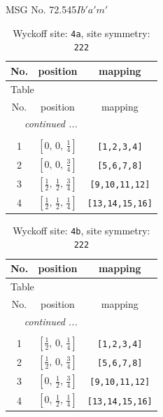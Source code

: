 \documentclass[fleqn,8pt]{jsarticle}
\begin{document}
\setcounter{MaxMatrixCols}{32}

\renewcommand{\tablename}{Table~}
\renewcommand{\figurename}{Figure~}
\begin{center}
\LARGE
MSG No. 72.545\quad$Ib'a'm'$
\end{center}
\renewcommand{\arraystretch}{1.2}
\begin{longtable}{ccc}
\caption{Wyckoff site: {\tt 4a}, site symmetry: {\tt 222}}
 \\
 \hline \hline
No. & position & mapping \\ \hline \endfirsthead

\multicolumn{2}{l}{\tablename\ \thetable{}} \\
 \hline \hline
No. & position & mapping \\ \hline \endhead

 \hline \hline
\multicolumn{2}{r}{\footnotesize\it continued ...} \\ \endfoot

 \hline \hline
\multicolumn{2}{r}{} \\ \endlastfoot

1 & $\left[ 0,\, 0,\, \frac{1}{4} \right]$ & {\tt [1,2,3,4]} \\ \hline
2 & $\left[ 0,\, 0,\, \frac{3}{4} \right]$ & {\tt [5,6,7,8]} \\ \hline
3 & $\left[ \frac{1}{2},\, \frac{1}{2},\, \frac{3}{4} \right]$ & {\tt [9,10,11,12]} \\ \hline
4 & $\left[ \frac{1}{2},\, \frac{1}{2},\, \frac{1}{4} \right]$ & {\tt [13,14,15,16]} \\
\end{longtable}
\renewcommand{\arraystretch}{1.2}
\begin{longtable}{ccc}
\caption{Wyckoff site: {\tt 4b}, site symmetry: {\tt 222}}
 \\
 \hline \hline
No. & position & mapping \\ \hline \endfirsthead

\multicolumn{2}{l}{\tablename\ \thetable{}} \\
 \hline \hline
No. & position & mapping \\ \hline \endhead

 \hline \hline
\multicolumn{2}{r}{\footnotesize\it continued ...} \\ \endfoot

 \hline \hline
\multicolumn{2}{r}{} \\ \endlastfoot

1 & $\left[ \frac{1}{2},\, 0,\, \frac{1}{4} \right]$ & {\tt [1,2,3,4]} \\ \hline
2 & $\left[ \frac{1}{2},\, 0,\, \frac{3}{4} \right]$ & {\tt [5,6,7,8]} \\ \hline
3 & $\left[ 0,\, \frac{1}{2},\, \frac{3}{4} \right]$ & {\tt [9,10,11,12]} \\ \hline
4 & $\left[ 0,\, \frac{1}{2},\, \frac{1}{4} \right]$ & {\tt [13,14,15,16]} \\
\end{longtable}
\end{document}
